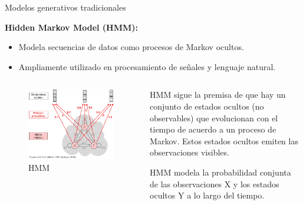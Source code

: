 \begin{frame}{Modelos generativos tradicionales}
    
\textbf{Hidden Markov Model (HMM):}
    \begin{itemize}
        \item Modela secuencias de datos como procesos de Markov ocultos.
        \item Ampliamente utilizado en procesamiento de señales y lenguaje natural.
    \end{itemize}


    \begin{columns}
    
        \begin{column}{0.4\textwidth}
            \begin{figure}
                \centering
                \includegraphics[width=1\linewidth]{Slides/figures/02_Metodos_Generativos/HMM.png}
                \caption{HMM}
                \label{fig:enter-label}
            \end{figure}
        \end{column}
        
        \scriptsize{
        \begin{column}{0.6\textwidth}
            HMM sigue la premisa de que hay un conjunto de estados ocultos (no observables) que evolucionan con el tiempo de acuerdo a un proceso de Markov. Estos estados ocultos emiten las observaciones visibles.
            
            HMM modela la probabilidad conjunta de las observaciones X y los estados ocultos Y a lo largo del tiempo.
        \end{column}
        }
    \end{columns}


    

    
    
\end{frame}
